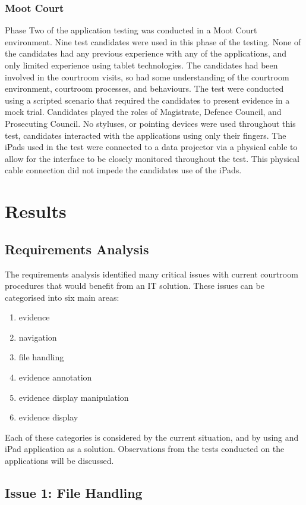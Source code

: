 \subsubsection{Moot Court}
Phase Two of the application testing was conducted in a Moot Court environment. Nine test candidates were used in this phase of the testing. None of the candidates had any previous experience with any of the applications, and only limited experience using tablet technologies. The candidates had been involved in the courtroom visits, so had some understanding of the courtroom environment, courtroom processes, and behaviours. The test were conducted using a scripted scenario that required the candidates to present evidence in a mock trial. Candidates played the roles of Magistrate, Defence Council, and Prosecuting Council. No styluses, or pointing devices were used throughout this test, candidates interacted with the applications using only their fingers. The iPads used in the test were connected to a data projector via a physical cable to allow for the interface to be closely monitored throughout the test. This physical cable connection did not impede the candidates use of the iPads.

\section{Results}
\subsection{Requirements Analysis}
The requirements analysis identified many critical issues with current courtroom procedures that would benefit from an IT solution. These issues can be categorised into six main areas:
 
\begin{enumerate}
\item evidence 
\item navigation
\item file handling
\item evidence annotation
\item evidence display manipulation
\item evidence display
\end{enumerate}
Each of these categories is considered by the current situation, and by using and iPad application as a solution. Observations from the tests conducted on the applications will be discussed.
 \subsection{Issue 1: File Handling}
